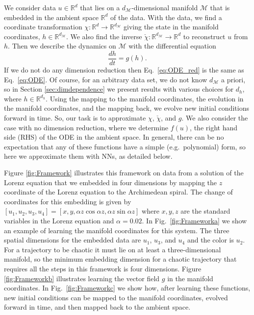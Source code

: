\documentclass[preprint,aps,pre,letterpaper,onecolumn,superscriptaddress]{revtex4-2} %
\newcommand{\IM}{\mathcal{M}}
\newcommand{\reals}{\mathbb{R}} %
\begin{document}

We consider data $u\in\reals^d$ that lies on a $d_\IM$-dimensional manifold $\mathcal{M}$ that is embedded in the ambient space $\mathbb{R}^d$ of the data. With the data, we find a coordinate transformation $\chi : \mathbb{R}^d \rightarrow \mathbb{R}^{d_\mathcal{M}}$ giving the state in the manifold coordinates, $h\in\mathbb{R}^{d_\mathcal{M}}$. We also find the inverse $\check{\chi} :\mathbb{R}^{d_\mathcal{M}} \rightarrow \mathbb{R}^d$ to reconstruct $u$ from $h$. Then we describe the dynamics on $\IM$ with the differential equation
	\begin{equation}\label{eq:ODE_red}
		\dfrac{dh}{dt}=g(h).
	\end{equation}
If we do not do any dimension reduction then Eq.\ \ref{eq:ODE_red} is the same as Eq.\ \ref{eq:ODE}. Of course, for an arbitrary data set, we do not know $d_\IM$ a priori, so in Section \ref{sec:dimdependence} we present results with various choices for $d_h$, where $h\in\mathbb{R}^{d_h}$. Using the mapping to the manifold coordinates, the evolution in the manifold coordinates, and the mapping back, we evolve new initial conditions forward in time. So, our task is to approximate $\chi$, $\check{\chi}$, and $g$. We also consider the case with no dimension reduction, where we determine $f(u)$, the right hand side (RHS) of the ODE in the ambient space. In general, there can be no expectation that any of these functions have a simple (e.g.\ polynomial) form, so here we approximate them with NNs, as detailed below.  

Figure \ref{fig:Framework} illustrates this framework on data from a solution of the Lorenz equation that we embedded in four dimensions by mapping the $z$ coordinate of the Lorenz equation to the Archimedean spiral. The change of coordinates for this embedding is given by $[u_1,u_2,u_3,u_4]=[x,y,\alpha z\cos \alpha z,\alpha z\sin \alpha z]$ where $x,y,z$ are the standard variables in the Lorenz equation and $\alpha=0.02$. In Fig.\ \ref{fig:Frameworka} we show an example of learning the manifold coordinates for this system. The three spatial dimensions for the embedded data are $u_1$, $u_3$, and $u_4$ and the color is $u_2$. For a trajectory to be chaotic it must lie on at least a three-dimensional manifold, so the minimum embedding dimension for a chaotic trajectory that requires all the steps in this framework is  four dimensions. Figure \ref{fig:Frameworkb} illustrates learning the vector field $g$ in the manifold coordinates. In Fig.\ \ref{fig:Frameworkc} we show how, after learning these functions, new initial conditions can be mapped to the manifold coordinates, evolved forward in time, and then mapped back to the ambient space.
\end{document}
